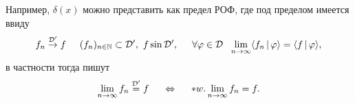 Например, $\delta(x)$ можно представить как предел РОФ, где под пределом имеется ввиду
\begin{equation*}
    f_n \overset{\mathcal D'}{\to} f \hspace{5 mm} 
    (f_n)_{n\in \mathbb{N}} \subset \mathcal D', \ f \sin \mathcal D',
    \hspace{5 mm} 
    \forall \varphi \in \mathcal D \ \ \lim_{n \to \infty} \langle f_n \,|\, \varphi \rangle  = \langle f \,|\, \varphi \rangle,
\end{equation*}
в частности тогда пишут
\begin{equation*}
    \lim_{n \to \infty} f_n \overset{\mathcal D'}{=} f 
    \hspace{5 mm} \Leftrightarrow \hspace{5 mm} 
    *w. \lim_{n \to \infty} f_n = f. 
\end{equation*}










% 
% 


